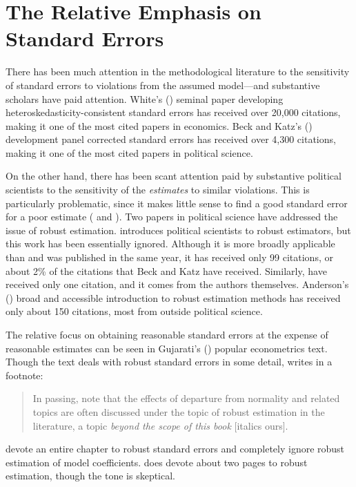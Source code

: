 \documentclass[12pt]{article}
\begin{document}
\section*{The Relative Emphasis on Standard Errors}

There has been much attention in the methodological literature to the sensitivity of standard errors to violations from the assumed model---and substantive scholars have paid attention.
White's (\citeyear{White1980}) seminal paper developing heteroskedasticity-consistent standard errors has received over 20,000 citations, making it one of the most cited papers in economics.
Beck and Katz's (\citeyear{BeckKatz1995}) development panel corrected standard errors has received over 4,300 citations, making it one of the most cited papers in political science.

On the other hand, there has been scant attention paid by substantive political scientists to the sensitivity of the \textit{estimates} to similar violations. 
This is particularly problematic, since it makes little sense to find a good standard error for a poor estimate (\citealt{Freedman2006} and \citealt{KingRoberts2014}). 
Two papers in political science have addressed the issue of robust estimation. 
\cite{Western1995} introduces political scientists to robust estimators, but this work has been essentially ignored. 
Although it is more broadly applicable than \cite{BeckKatz1995} and was published in the same year, it has received only 99 citations, or  about 2\% of the citations that Beck and Katz have received. 
Similarly, \cite{HardenDesmarais2011} have received only one citation, and it comes from the authors themselves.
Anderson's (\citeyear{Anderson2008}) broad and accessible introduction to robust estimation methods has received only about 150 citations, most from outside political science.

The relative focus on obtaining reasonable standard errors at the expense of reasonable estimates can be seen in Gujarati's (\citeyear{Gujarati2004}) popular econometrics text. Though the text deals with robust standard errors in some detail, \citet[p. 339]{Gujarati2004} writes in a footnote:
\begin{quote}
In passing, note that the effects of departure from normality and related topics are often discussed under the topic of robust estimation in the literature, a topic \textit{beyond the scope of this book} [italics ours].
\end{quote}
\cite{AngristPischke2009} devote an entire chapter to robust standard errors and completely ignore robust estimation of model coefficients. 
\cite{Wooldridge2013} does devote about two pages to robust estimation, though the tone is skeptical.
\end{document}
